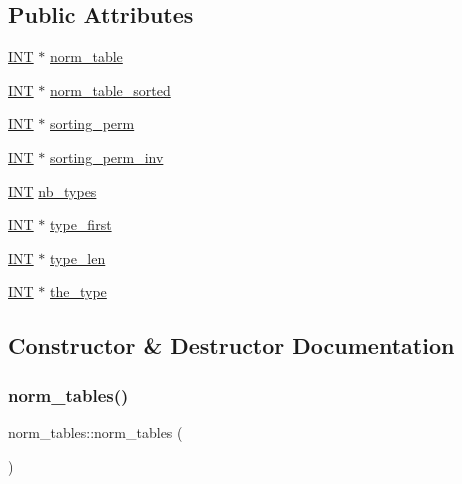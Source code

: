 \subsection*{Public Attributes}
\begin{DoxyCompactItemize}
\item 
\mbox{\hyperlink{galois_8h_a09fddde158a3a20bd2dcadb609de11dc}{I\+NT}} $\ast$ \mbox{\hyperlink{classnorm__tables_a405d3dc9cd3b6f74959f83e755bada45}{norm\+\_\+table}}
\item 
\mbox{\hyperlink{galois_8h_a09fddde158a3a20bd2dcadb609de11dc}{I\+NT}} $\ast$ \mbox{\hyperlink{classnorm__tables_acd708401d0a2a66ee1b4d1e3c62f807c}{norm\+\_\+table\+\_\+sorted}}
\item 
\mbox{\hyperlink{galois_8h_a09fddde158a3a20bd2dcadb609de11dc}{I\+NT}} $\ast$ \mbox{\hyperlink{classnorm__tables_a03f051897b0b1db4fa6e9d0738f3ade7}{sorting\+\_\+perm}}
\item 
\mbox{\hyperlink{galois_8h_a09fddde158a3a20bd2dcadb609de11dc}{I\+NT}} $\ast$ \mbox{\hyperlink{classnorm__tables_a8e5c8871d55a30d16edd82aa36533c19}{sorting\+\_\+perm\+\_\+inv}}
\item 
\mbox{\hyperlink{galois_8h_a09fddde158a3a20bd2dcadb609de11dc}{I\+NT}} \mbox{\hyperlink{classnorm__tables_aa31368c0198e66af3d6958d556171ee2}{nb\+\_\+types}}
\item 
\mbox{\hyperlink{galois_8h_a09fddde158a3a20bd2dcadb609de11dc}{I\+NT}} $\ast$ \mbox{\hyperlink{classnorm__tables_a855ab204e7e677fed9843d3c3e73ee6c}{type\+\_\+first}}
\item 
\mbox{\hyperlink{galois_8h_a09fddde158a3a20bd2dcadb609de11dc}{I\+NT}} $\ast$ \mbox{\hyperlink{classnorm__tables_a5141f3b18041bf97ddff2b48875fdae6}{type\+\_\+len}}
\item 
\mbox{\hyperlink{galois_8h_a09fddde158a3a20bd2dcadb609de11dc}{I\+NT}} $\ast$ \mbox{\hyperlink{classnorm__tables_a24b34653e45a756df45a040186bf8032}{the\+\_\+type}}
\end{DoxyCompactItemize}


\subsection{Constructor \& Destructor Documentation}
\mbox{\label{classnorm__tables_a19c3b94e0a0cd2e956490a7af950034b}} 
\subsubsection{\texorpdfstring{norm\+\_\+tables()}{norm\_tables()}}
{\footnotesize\ttfamily norm\+\_\+tables\+::norm\+\_\+tables (\begin{DoxyParamCaption}{ }\end{DoxyParamCaption})}

